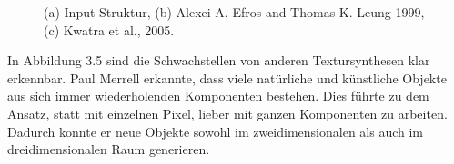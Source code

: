 \documentclass[12pt, a4paper,twoside,openright]{report} %
\begin{document}
\begin{figure}[H]
    \centering
    \qquad
    \qquad
    \caption{(a) Input Struktur, (b) Alexei A. Efros and Thomas K. Leung 1999, (c) Kwatra et al., 2005. \cite{merrell2009model}}%
\end{figure}

In Abbildung 3.5 sind die Schwachstellen von anderen Textursynthesen klar erkennbar.
\newline
Paul Merrell erkannte, dass viele natürliche und künstliche Objekte aus sich immer wiederholenden Komponenten bestehen.
Dies führte zu dem Ansatz, statt mit einzelnen Pixel, lieber mit ganzen Komponenten zu arbeiten.
Dadurch konnte er neue Objekte sowohl im zweidimensionalen als auch im dreidimensionalen Raum generieren.
\end{document}
